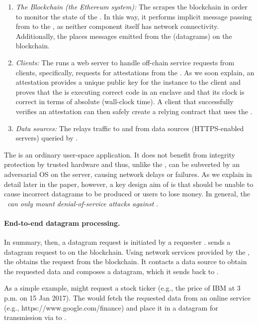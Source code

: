 \begin{enumerate}
\item {\em The Blockchain (the Ethereum system):}  The \medname scrapes the blockchain in order to monitor the state of the \tcontract  \tcont. In this way, it performs implicit message passing from \tcont to the \encname, as neither component itself has network connectivity. Additionally, the \medname places messages emitted from the \encname (datagrams) on the blockchain.
\item {\em Clients:} The \medname runs a web server to handle off-chain service requests from clients, specifically, requests for attestations from the \encname. As we soon explain, an attestation provides a unique public key for the \encname instance to the  client and proves that the \encname is executing correct code in an enclave and that its clock is correct in terms of absolute (wall-clock time). A client that successfully verifies an attestation can then safely create a relying contract \reqcont that uses the \tc.
\item {\em Data sources:} The \medname relays traffic to and from data sources (HTTPS-enabled servers) queried by \encname. 
\end{enumerate}

The \medname is an ordinary user-space application. It does not benefit from integrity protection by trusted hardware and thus, unlike the \encname, can be subverted by an adversarial OS on the \tc server, causing network delays or failures. As we explain in detail later in the paper, however, a key design aim of \tc is that \medname should be unable to cause incorrect datagrams to be produced or users to lose money. In general, the \medname~{\em can only mount denial-of-service attacks against \tc}. 

\paragraph{End-to-end datagram processing.}
In summary, then, a datagram request is initiated by a requester \reqcont. \reqcont sends a datagram request to \tcont on the blockchain. Using network services provided by the \medname, the \encname obtains the request from the blockchain. It contacts a data source to obtain the requested data and composes a datagram, which it sends back to \reqcont.

As a simple example, \reqcont might request a stock ticker  (e.g., the price of IBM at 3 p.m. on 15 Jan 2017). The \encname would fetch the requested data from an online service (e.g., https://www.google.com/finance) and place it in a datagram for transmission via \tcont to \reqcont.

